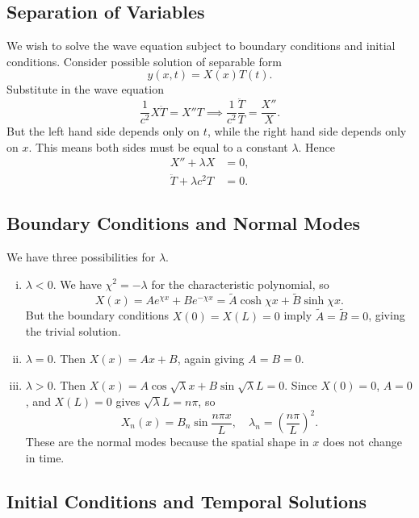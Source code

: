\documentclass[12pt]{article}
\begin{document}
\subsection{Separation of Variables}%
\label{sub:separation_of_variables}

We wish to solve the wave equation subject to boundary conditions and initial conditions. Consider possible solution of separable form
\[
	y(x, t) = X(x) T(t)
.\]
Substitute in the wave equation
\[
\frac{1}{c^2} X \ddot T = X'' T \implies \frac{1}{c^2} \frac{\ddot T}{T} = \frac{X''}{X}
.\]
But the left hand side depends only on $t$, while the right hand side depends only on $x$. This means both sides must be equal to a constant $\lambda$. Hence
\begin{align*}
	X'' + \lambda X &= 0, \\
	\ddot T + \lambda c^2 T &= 0.
\end{align*}

\subsection{Boundary Conditions and Normal Modes}%
\label{sub:boundary_conditions_and_normal_modes}

We have three possibilities for $\lambda$.
\begin{enumerate}[(i)]
	\item $\lambda < 0$. We have $\chi^2 = - \lambda$ for the characteristic polynomial, so
		\[
			X(x) = A e^{\chi x} + Be^{-\chi x} = \tilde A \cosh \chi x + \tilde B \sinh \chi x
		.\]
		But the boundary conditions $X(0) = X(L) = 0$ imply $\tilde A = \tilde B = 0$, giving the trivial solution.
	\item $\lambda = 0$. Then $X(x) = Ax + B$, again giving $A = B = 0$.
	\item $\lambda > 0$. Then $X(x) = A \cos \sqrt \lambda x + B \sin \sqrt \lambda L = 0$. Since $X(0) = 0$, $A = 0$, and $X(L) = 0$ gives $\sqrt \lambda L = n \pi$, so
		\[
			X_n(x) = B_n \sin \frac{n \pi x}{L}, \quad \lambda_n = \left( \frac{n \pi}{L}\right)^2
		.\]
		These are the normal modes because the spatial shape in $x$ does not change in time.
\end{enumerate}

\subsection{Initial Conditions and Temporal Solutions}%
\label{sub:initial_conditions_and_temporal_solutions}
\end{document}
